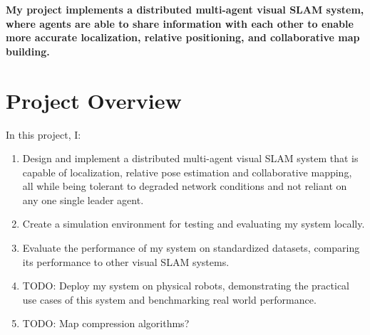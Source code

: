 \textbf{My project implements a distributed multi-agent visual SLAM system, where agents are able to share information with each other to enable more accurate localization, relative positioning, and collaborative map building.}

\section{Project Overview}
\label{sec:1.3}
In this project, I: \noparskip
{
    \begin{enumerate}
        \item Design and implement a distributed multi-agent visual SLAM system that is capable of localization, relative pose estimation and  collaborative mapping, all while being tolerant to degraded network conditions and not reliant on any one single leader agent.
        \item Create a simulation environment for testing and evaluating my system locally.
        \item Evaluate the performance of my system on standardized datasets, comparing its performance to other visual SLAM systems.
        \item TODO: Deploy my system on physical robots, demonstrating the practical use cases of this system and benchmarking real world performance.
        \item TODO: Map compression algorithms?
    \end{enumerate}
}
